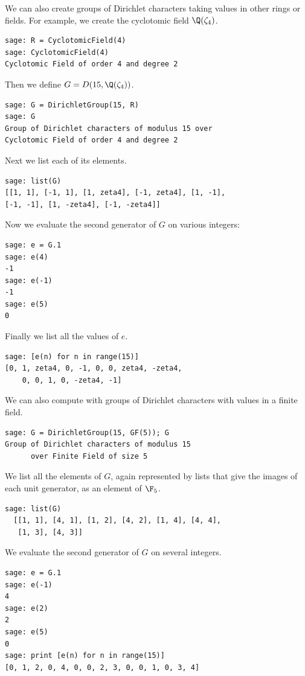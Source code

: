 We can also create groups of Dirichlet characters 
taking values in other rings or fields. 
For example, we create the cyclotomic field $\Q(\zeta_4)$.
\begin{verbatim}
sage: R = CyclotomicField(4)
sage: CyclotomicField(4)
Cyclotomic Field of order 4 and degree 2
\end{verbatim}%

Then we define $G = D(15,\Q({\zeta_4}))$.
\begin{verbatim}
sage: G = DirichletGroup(15, R)
sage: G
Group of Dirichlet characters of modulus 15 over 
Cyclotomic Field of order 4 and degree 2
\end{verbatim}%

Next we list each of its elements. 
\begin{verbatim}
sage: list(G)
[[1, 1], [-1, 1], [1, zeta4], [-1, zeta4], [1, -1], 
[-1, -1], [1, -zeta4], [-1, -zeta4]]
\end{verbatim}%

Now we evaluate the second generator of $G$ on various
integers:
\begin{verbatim}
sage: e = G.1
sage: e(4)
-1
sage: e(-1)
-1
sage: e(5)
0
\end{verbatim}%

Finally we list all the values of $e$.
\begin{verbatim}
sage: [e(n) for n in range(15)]
[0, 1, zeta4, 0, -1, 0, 0, zeta4, -zeta4, 
    0, 0, 1, 0, -zeta4, -1]
\end{verbatim}

We can also compute with groups of Dirichlet characters
with values in a finite field.
\begin{verbatim}
sage: G = DirichletGroup(15, GF(5)); G
Group of Dirichlet characters of modulus 15 
      over Finite Field of size 5
\end{verbatim}%

We list all the elements of $G$, again represented by lists
that give the images of each unit generator, as an element of $\F_5$.
\begin{verbatim}
sage: list(G)
  [[1, 1], [4, 1], [1, 2], [4, 2], [1, 4], [4, 4], 
   [1, 3], [4, 3]]
\end{verbatim}%

We evaluate the second generator of $G$ on several integers. 
\begin{verbatim}
sage: e = G.1
sage: e(-1)
4
sage: e(2)
2
sage: e(5)
0
sage: print [e(n) for n in range(15)]
[0, 1, 2, 0, 4, 0, 0, 2, 3, 0, 0, 1, 0, 3, 4]
\end{verbatim}

